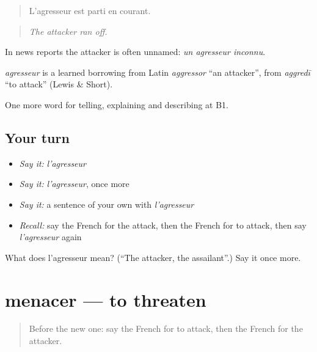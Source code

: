 \begin{quote}
L'agresseur est parti en courant.
\end{quote}

\begin{quote}
\emph{The attacker ran off.}
\end{quote}

In news reports the attacker is often unnamed: \emph{un agresseur inconnu}.

\begin{cousinweb}
\emph{agresseur} is a learned borrowing from Latin \emph{aggressor} \textquotedblleft{}an attacker\textquotedblright{}, from \emph{aggredī} \textquotedblleft{}to attack\textquotedblright{} (Lewis \& Short).
\end{cousinweb}

\begin{grammarlens}[title={What you've built}]
One more word for telling, explaining and describing at B1.
\end{grammarlens}

\subsection*{Your turn}
\begin{itemize}
\raggedright
  \item \emph{Say it:} \emph{l'agresseur}
  \item \emph{Say it:} \emph{l'agresseur}, once more
  \item \emph{Say it:} a sentence of your own with \emph{l'agresseur}
  \item \emph{Recall:} say the French for the attack, then the French for to attack, then say \emph{l'agresseur} again
\end{itemize}

\begin{tcolorbox}[breakable,colback=teal!4,colframe=teal!35!black,title={Before you move on}]
What does l'agresseur mean? (\textquotedblleft{}The attacker, the assailant\textquotedblright{}.) Say it once more.
\end{tcolorbox}
\section[menacer]{menacer — to threaten}

\label{lesson:FR-C289-menacer}



\begin{quote}
Before the new one: say the French for to attack, then the French for the attacker.
\end{quote}

